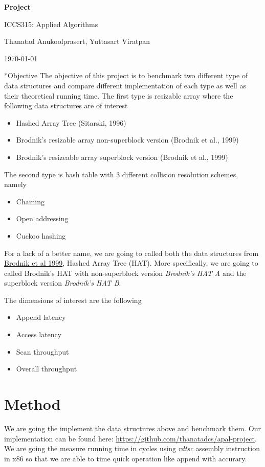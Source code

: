 \documentclass{article} %
\newcommand{\question}[2][]{\begin{flushleft}
        \textbf{Question #1}: \textit{#2}

\end{flushleft}}
\newcommand{\maketitletwo}[2][]{\begin{center}
        \Large{\textbf{Project #1}
            
            ICCS315: Applied Algorithms} %
        \vspace{5pt}
        
        \normalsize{Thanatad Anukoolprasert, Yuttasart Viratpan   %
        
        \today}        %
        \vspace{15pt}
        
\end{center}}
\begin{document}
    \maketitletwo[]  %
    
    \section*{Objective}
    The objective of this project is to benchmark two different type of data structures and compare different
    implementation of each type as well as their theoretical running time.
    The first type is resizable array where the following data structures are of interest
    \begin{itemize}
        \item Hashed Array Tree (Sitarski, 1996)
        \item Brodnik's resizable array non-superblock version (Brodnik et al., 1999)
        \item Brodnik's resizeable array superblock version (Brodnik et al., 1999)
    \end{itemize}
    The second type is hash table with 3 different collision resolution schemes, namely
    \begin{itemize}
        \item Chaining
        \item Open addressing
        \item Cuckoo hashing
    \end{itemize}
    
    For a lack of a better name, we are going to called both the data structures from \href{ https://sedgewick.io/wp-content/themes/sedgewick/papers/1999Optimal.pdf}{ Brodnik et al 1999}, Hashed Array Tree (HAT).
    More specifically, we are going to called Brodnik's HAT with non-superblock version \emph{Brodnik's HAT A} and the superblock version \emph{Brodnik's HAT B}.

    The dimensions of interest are the following
    \begin{itemize}
        \item Append latency
        \item Access latency
        \item Scan throughput
        \item Overall throughput
    \end{itemize}

    \section*{Method}
    We are going the implement the data structures above and benchmark them. Our implementation can be found here: \href{https://github.com/thanatadcs/apal-project}{ https://github.com/thanatadcs/apal-project}.
    We are going the measure running time in cycles using
    \emph{rdtsc} assembly instruction in x86 so that we are able to time quick operation like append with accurary.
\end{document}
